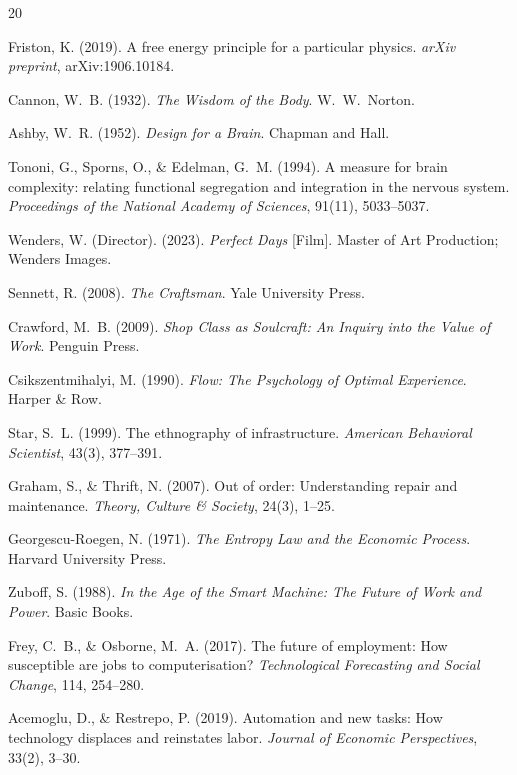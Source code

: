 \documentclass[12pt,a4paper]{article}
\theoremstyle{plain}
\theoremstyle{definition}
\theoremstyle{remark}
\begin{document}
\begin{thebibliography}{20}

Friston, K. (2019).
A free energy principle for a particular physics.
\textit{arXiv preprint}, arXiv:1906.10184.

Cannon, W.~B. (1932).
\textit{The Wisdom of the Body}.
W.~W.~Norton.

Ashby, W.~R. (1952).
\textit{Design for a Brain}.
Chapman and Hall.

Tononi, G., Sporns, O., \& Edelman, G.~M. (1994).
A measure for brain complexity: relating functional segregation and integration
in the nervous system.
\textit{Proceedings of the National Academy of Sciences}, 91(11), 5033--5037.

Wenders, W. (Director). (2023).
\textit{Perfect Days} [Film].
Master of Art Production; Wenders Images.

Sennett, R. (2008).
\textit{The Craftsman}.
Yale University Press.

Crawford, M.~B. (2009).
\textit{Shop Class as Soulcraft: An Inquiry into the Value of Work}.
Penguin Press.

Csikszentmihalyi, M. (1990).
\textit{Flow: The Psychology of Optimal Experience}.
Harper \& Row.

Star, S.~L. (1999).
The ethnography of infrastructure.
\textit{American Behavioral Scientist}, 43(3), 377--391.

Graham, S., \& Thrift, N. (2007).
Out of order: Understanding repair and maintenance.
\textit{Theory, Culture \& Society}, 24(3), 1--25.

Georgescu-Roegen, N. (1971).
\textit{The Entropy Law and the Economic Process}.
Harvard University Press.

Zuboff, S. (1988).
\textit{In the Age of the Smart Machine: The Future of Work and Power}.
Basic Books.

Frey, C.~B., \& Osborne, M.~A. (2017).
The future of employment: How susceptible are jobs to computerisation?
\textit{Technological Forecasting and Social Change}, 114, 254--280.

Acemoglu, D., \& Restrepo, P. (2019).
Automation and new tasks: How technology displaces and reinstates labor.
\textit{Journal of Economic Perspectives}, 33(2), 3--30.


\end{thebibliography}
\end{document}
